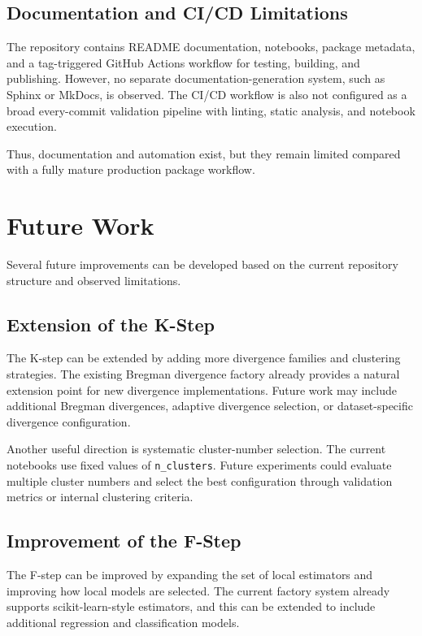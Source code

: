 \subsection{Documentation and CI/CD Limitations}

The repository contains README documentation, notebooks, package metadata, and a tag-triggered GitHub Actions workflow for testing, building, and publishing. However, no separate documentation-generation system, such as Sphinx or MkDocs, is observed. The CI/CD workflow is also not configured as a broad every-commit validation pipeline with linting, static analysis, and notebook execution.

Thus, documentation and automation exist, but they remain limited compared with a fully mature production package workflow.

\section{Future Work}
\label{sec:future_work}

Several future improvements can be developed based on the current repository structure and observed limitations.

\subsection{Extension of the K-Step}

The K-step can be extended by adding more divergence families and clustering strategies. The existing Bregman divergence factory already provides a natural extension point for new divergence implementations. Future work may include additional Bregman divergences, adaptive divergence selection, or dataset-specific divergence configuration.

Another useful direction is systematic cluster-number selection. The current notebooks use fixed values of \texttt{n\_clusters}. Future experiments could evaluate multiple cluster numbers and select the best configuration through validation metrics or internal clustering criteria.

\subsection{Improvement of the F-Step}

The F-step can be improved by expanding the set of local estimators and improving how local models are selected. The current factory system already supports scikit-learn-style estimators, and this can be extended to include additional regression and classification models.

